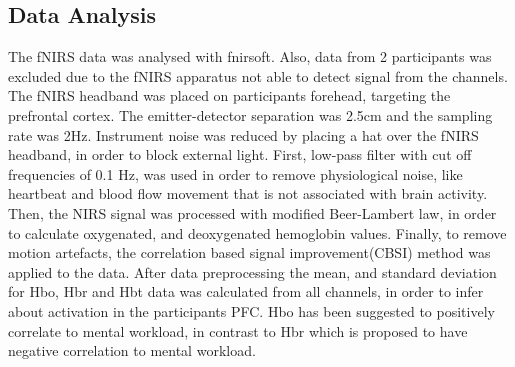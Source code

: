 \documentclass[../main/Feedback.tex]{subfiles}
\begin{document}
\subsection{Data Analysis}
The fNIRS data was analysed with fnirsoft\cite{ayazfunctional}. Also, data from 2 participants was excluded due to the fNIRS apparatus not able to detect signal from the channels. 
The fNIRS headband was placed on participants forehead, targeting the prefrontal cortex. The emitter-detector separation was 2.5cm and the sampling rate was 2Hz.
Instrument noise was reduced by placing a hat over the fNIRS headband, in order to block external light.
First, low-pass filter with cut off frequencies of 0.1 Hz, was used in order to remove physiological noise, like heartbeat and blood flow movement that is not associated with brain activity.
Then, the NIRS signal was processed with modified Beer-Lambert law\cite{cope1988system}, in order to calculate oxygenated, and deoxygenated hemoglobin values.
Finally, to remove motion artefacts, the correlation based signal improvement(CBSI)\cite{cui2010functional} method was applied to the data.
After data preprocessing the mean, and standard deviation for Hbo, Hbr and Hbt data was calculated from all channels, in order to infer about activation in the participants PFC. Hbo has been suggested to positively correlate to mental workload\cite{peck2013using}, in contrast to Hbr which is proposed to have negative correlation to mental workload.\\
\end{document}

